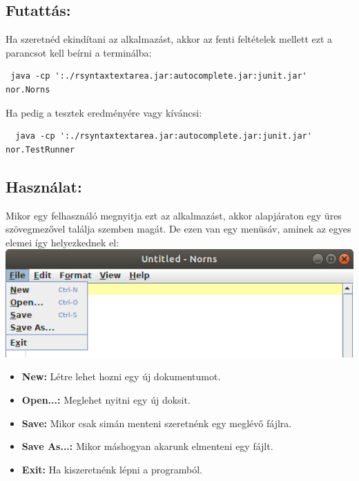 \documentclass[12pt]{article}
\begin{document}
\subsection*{Futattás: }
Ha szeretnéd ekindítani az alkalmazást, akkor az fenti feltételek mellett ezt a
parancsot kell beírni a terminálba:
\begin{lstlisting}
 java -cp ':./rsyntaxtextarea.jar:autocomplete.jar:junit.jar' nor.Norns
\end{lstlisting}

Ha pedig a tesztek eredményére vagy kíváncsi:
\begin{lstlisting}
  java -cp ':./rsyntaxtextarea.jar:autocomplete.jar:junit.jar' nor.TestRunner
\end{lstlisting}

\subsection*{Használat:}
Mikor egy felhasználó megnyitja ezt az alkalmazást, akkor alapjáraton egy
üres szövegmezővel találja szemben magát. De ezen van egy menüsáv, aminek
az egyes elemei így helyezkednek el:
\includegraphics[width = \textwidth]{FileMenu}
\begin{itemize}
  \item \textbf{New:} Létre lehet hozni egy új dokumentumot.
  \item \textbf{Open...:} Meglehet nyitni egy új doksit.
  \item \textbf{Save:} Mikor csak simán menteni szeretnénk egy meglévő fájlra.
  \item \textbf{Save As...:} Mikor máshogyan akarunk elmenteni egy fájlt.
  \item \textbf{Exit:} Ha kiszeretnénk lépni a programból.
\end{itemize}
\end{document}
